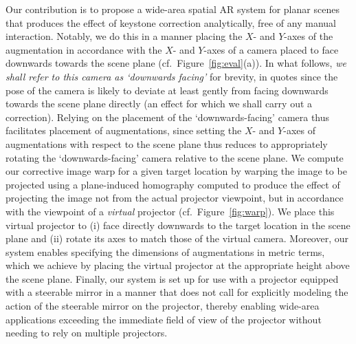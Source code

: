 \documentclass[review]{elsarticle}
\begin{document}
Our contribution is to propose a wide-area spatial AR system for planar scenes that produces the effect of keystone correction analytically, free of any manual interaction. Notably, we do this in a manner placing the $X$- and $Y$-axes of the augmentation in accordance with the $X$- and $Y$-axes of a camera placed to face downwards towards the scene plane (cf.\ Figure~\ref{fig:eval}(a)). In what follows,  \textit{we shall refer to this camera as `downwards facing'} for brevity, in quotes since the pose of the camera is likely to deviate at least gently from facing downwards towards the scene plane directly (an effect for which we shall carry out a correction). Relying on the placement of the `downwards-facing' camera thus facilitates placement of augmentations, since setting the $X$- and $Y$-axes of augmentations with respect to the scene plane thus reduces to appropriately rotating the `downwards-facing' camera relative to the scene plane. We compute our corrective image warp for a given target location by warping the image to be projected using a plane-induced homography computed to produce the effect of projecting the image not from the actual projector viewpoint, but in accordance with the viewpoint of a \textit{virtual} projector (cf.\ Figure~\ref{fig:warp}). We place this virtual projector to (i) face directly downwards to the target location in the scene plane and (ii) rotate its axes to match those of the virtual camera. Moreover, our system enables specifying the dimensions of augmentations in metric terms, which we achieve by placing the virtual projector at the appropriate height above the scene plane. Finally, our system is set up for use with a projector equipped with a steerable mirror in a manner that does not call for explicitly modeling the action of the steerable mirror on the projector, thereby enabling wide-area applications exceeding the immediate field of view of the projector without needing to rely on multiple projectors.

\end{document}
